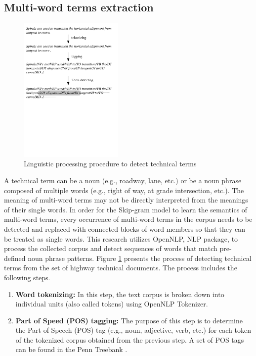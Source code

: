 \documentclass[Journal,InsideFigs, DoubleSpace]{ascelike} %
\begin{document}
{\subsection{Multi-word terms extraction}
%
\begin{figure}[t]
	\centering
	\includegraphics[width=0.45\textwidth]{Figure2_term_extraction}
	\caption{Linguistic processing procedure to detect technical terms}
	\label{fig:np_detect}
\end{figure}
%
A technical term can be a noun (e.g., roadway, lane, etc.) or be a noun phrase composed of multiple words (e.g., right of way, at grade intersection, etc.). The meaning of multi-word terms may not be directly interpreted from the meanings of their single words. In order for the Skip-gram model to learn the semantics of multi-word terms, every occurrence of multi-word terms in the corpus needs to be detected and replaced with connected blocks of word members so that they can be treated as single words. This research utilizes OpenNLP, NLP package, to process the collected corpus and detect sequences of words that match pre-defined noun phrase patterns. Figure \ref{fig:np_detect} presents the process of detecting technical terms from the set of highway technical documents. The process includes the following steps. 
\par
\begin{enumerate} [label=\roman*]
	\item \textbf{Word tokenizing:} In this step, the text corpus is broken down into individual units (also called tokens) using OpenNLP Tokenizer.
	\item \textbf{Part of Speed (POS) tagging:} The purpose of this step is to determine the Part of Speech (POS) tag (e.g., noun, adjective, verb, etc.) for each token of the tokenized corpus obtained from the previous step. A set of POS tags can be found in the Penn Treebank \cite{marcus93}.

\end{enumerate}}
\end{document}
